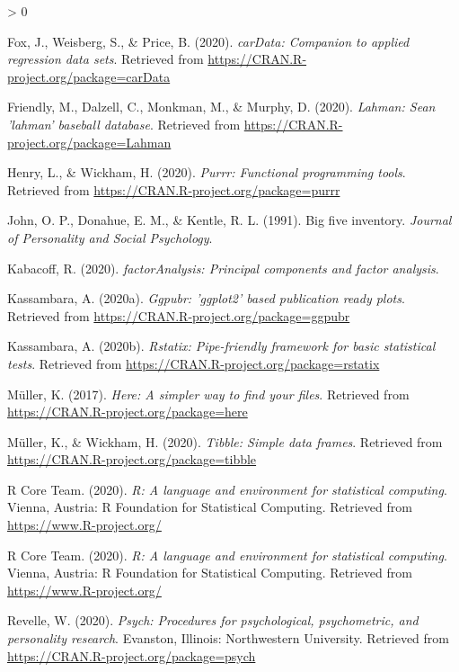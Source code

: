 \documentclass[
  english,
  man, fleqn, noextraspace]{apa6}
\newlength{\cslhangindent}
\newenvironment{CSLReferences}[2] %
 {%
  \setlength{\parindent}{0pt}
  \ifodd #1 \everypar{\setlength{\hangindent}{\cslhangindent}}\ignorespaces\fi
  \ifnum #2 > 0
  \setlength{\parskip}{#2\baselineskip}
  \fi
 }%
 {}
\begin{document}
\begin{CSLReferences}{1}{0}
\leavevmode\hypertarget{ref-R-carData}{}%
Fox, J., Weisberg, S., \& Price, B. (2020). \emph{carData: Companion to applied regression data sets}. Retrieved from \url{https://CRAN.R-project.org/package=carData}

\leavevmode\hypertarget{ref-R-Lahman}{}%
Friendly, M., Dalzell, C., Monkman, M., \& Murphy, D. (2020). \emph{Lahman: Sean 'lahman' baseball database}. Retrieved from \url{https://CRAN.R-project.org/package=Lahman}

\leavevmode\hypertarget{ref-R-purrr}{}%
Henry, L., \& Wickham, H. (2020). \emph{Purrr: Functional programming tools}. Retrieved from \url{https://CRAN.R-project.org/package=purrr}

\leavevmode\hypertarget{ref-john1991}{}%
John, O. P., Donahue, E. M., \& Kentle, R. L. (1991). Big five inventory. \emph{Journal of Personality and Social Psychology}.

\leavevmode\hypertarget{ref-R-factorAnalysis}{}%
Kabacoff, R. (2020). \emph{factorAnalysis: Principal components and factor analysis}.

\leavevmode\hypertarget{ref-R-ggpubr}{}%
Kassambara, A. (2020a). \emph{Ggpubr: 'ggplot2' based publication ready plots}. Retrieved from \url{https://CRAN.R-project.org/package=ggpubr}

\leavevmode\hypertarget{ref-R-rstatix}{}%
Kassambara, A. (2020b). \emph{Rstatix: Pipe-friendly framework for basic statistical tests}. Retrieved from \url{https://CRAN.R-project.org/package=rstatix}

\leavevmode\hypertarget{ref-R-here}{}%
Müller, K. (2017). \emph{Here: A simpler way to find your files}. Retrieved from \url{https://CRAN.R-project.org/package=here}

\leavevmode\hypertarget{ref-R-tibble}{}%
Müller, K., \& Wickham, H. (2020). \emph{Tibble: Simple data frames}. Retrieved from \url{https://CRAN.R-project.org/package=tibble}

\leavevmode\hypertarget{ref-R-base}{}%
R Core Team. (2020). \emph{R: A language and environment for statistical computing}. Vienna, Austria: R Foundation for Statistical Computing. Retrieved from \url{https://www.R-project.org/}

\leavevmode\hypertarget{ref-R-base}{}%
R Core Team. (2020). \emph{R: A language and environment for statistical computing}. Vienna, Austria: R Foundation for Statistical Computing. Retrieved from \url{https://www.R-project.org/}

\leavevmode\hypertarget{ref-R-psych}{}%
Revelle, W. (2020). \emph{Psych: Procedures for psychological, psychometric, and personality research}. Evanston, Illinois: Northwestern University. Retrieved from \url{https://CRAN.R-project.org/package=psych}


\end{CSLReferences}
\end{document}
